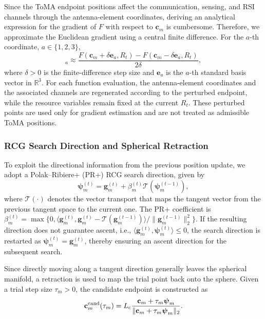 \documentclass[letterpaper,journal]{IEEEtran}
\begin{document}
Since the ToMA endpoint positions affect the communication, sensing, and RSI channels through the antenna-element coordinates, deriving an analytical expression for the gradient of $F$ with respect to $\mathbf c_m$ is cumbersome. Therefore, we approximate the Euclidean gradient using a central finite difference. For the $a$-th coordinate, $a\in\{1,2,3\}$,
\begin{equation}
[\nabla_{\mathbf c_m}F]_a
\approx
\frac{
F(\mathbf c_m+\delta\mathbf e_a,R_t)
-
F(\mathbf c_m-\delta\mathbf e_a,R_t)
}{
2\delta
},
\label{eq:central_difference}
\end{equation}
where $\delta>0$ is the finite-difference step size and $\mathbf e_a$ is the $a$-th standard basis vector in $\mathbb R^3$. For each function evaluation, the antenna-element coordinates and the associated channels are regenerated according to the perturbed endpoint, while the resource variables remain fixed at the current $R_t$. These perturbed points are used only for gradient estimation and are not treated as admissible ToMA positions.

\subsubsection{RCG Search Direction and Spherical Retraction}

To exploit the directional information from the previous position update, we adopt a Polak--Ribiere+ (PR+) RCG search direction, given by
\begin{equation}
\boldsymbol\psi_m^{(t)}
=
\mathbf g_m^{(t)}
+
\beta_m^{(t)}
\mathcal T
\left(
\boldsymbol\psi_m^{(t-1)}
\right),
\label{eq:rcg_direction}
\end{equation}
where $\mathcal T(\cdot)$ denotes the vector transport that maps the tangent vector from the previous tangent space to the current one. The PR+ coefficient is $\beta_m^{(t)}=\max\{0,\langle\mathbf g_m^{(t)},\mathbf g_m^{(t)}-\mathcal T(\mathbf g_m^{(t-1)})\rangle/\|\mathbf g_m^{(t-1)}\|_2^2\}$. If the resulting direction does not guarantee ascent, i.e., $\langle\mathbf g_m^{(t)},\boldsymbol\psi_m^{(t)}\rangle\le0$, the search direction is restarted as $\boldsymbol\psi_m^{(t)}=\mathbf g_m^{(t)}$, thereby ensuring an ascent direction for the subsequent search.

Since directly moving along a tangent direction generally leaves the spherical manifold, a retraction is used to map the trial point back onto the sphere. Given a trial step size $\tau_m>0$, the candidate endpoint is constructed as
\begin{equation}
\mathbf c_m^{\rm cand}(\tau_m)
=
L_{\rm c}
\frac{
\mathbf c_m+\tau_m\boldsymbol\psi_m
}{
\|\mathbf c_m+\tau_m\boldsymbol\psi_m\|_2
}.
\label{eq:spherical_retraction}
\end{equation}
\end{document}
